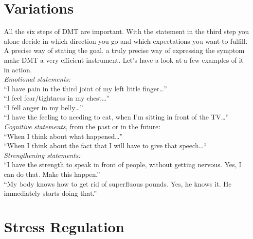 \documentclass[../main.tex]{subfiles}
\begin{document}


\section{Variations}

All the six steps of DMT are important.
With the statement in the third step you alone decide in which direction you go and which expectations you want to fulfill.
A precise way of stating the goal, a truly precise way of expressing the symptom make DMT a very efficient instrument.
Let's have a look at a few examples of it in action.\\

\noindent \emph{Emotional statements:}\\
``I have pain in the third joint of my left little finger\ldots''\\
``I feel fear/tightness in my chest\ldots''\\
``I fell anger in my belly\ldots''\\
``I have the feeling to needing to eat, when I'm sitting in front of the TV\ldots''\\

\noindent \emph{Cognitive statements}, from the past or in the future:\\
``When I think about what happened\ldots''\\
``When I think about the fact that I  will have to give that speech\ldots``\\

\noindent \emph{Strengthening statements:}\\
``I have the strength to speak in front of people, without getting nervous. Yes, I can do that. Make this happen.''\\
``My body knows how to get rid of superfluous pounds. Yes, he knows it. He immediately starts doing that.''

\section{Stress Regulation}
\end{document}

